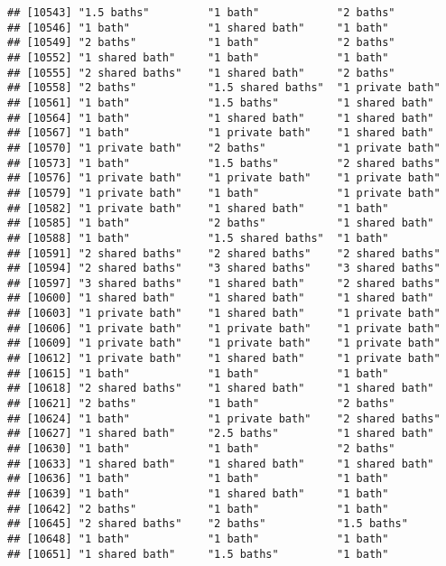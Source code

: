 \documentclass[
]{article}
\begin{document}
\begin{verbatim}
## [10543] "1.5 baths"         "1 bath"            "2 baths"          
## [10546] "1 bath"            "1 shared bath"     "1 bath"           
## [10549] "2 baths"           "1 bath"            "2 baths"          
## [10552] "1 shared bath"     "1 bath"            "1 bath"           
## [10555] "2 shared baths"    "1 shared bath"     "2 baths"          
## [10558] "2 baths"           "1.5 shared baths"  "1 private bath"   
## [10561] "1 bath"            "1.5 baths"         "1 shared bath"    
## [10564] "1 bath"            "1 shared bath"     "1 shared bath"    
## [10567] "1 bath"            "1 private bath"    "1 shared bath"    
## [10570] "1 private bath"    "2 baths"           "1 private bath"   
## [10573] "1 bath"            "1.5 baths"         "2 shared baths"   
## [10576] "1 private bath"    "1 private bath"    "1 private bath"   
## [10579] "1 private bath"    "1 bath"            "1 private bath"   
## [10582] "1 private bath"    "1 shared bath"     "1 bath"           
## [10585] "1 bath"            "2 baths"           "1 shared bath"    
## [10588] "1 bath"            "1.5 shared baths"  "1 bath"           
## [10591] "2 shared baths"    "2 shared baths"    "2 shared baths"   
## [10594] "2 shared baths"    "3 shared baths"    "3 shared baths"   
## [10597] "3 shared baths"    "1 shared bath"     "2 shared baths"   
## [10600] "1 shared bath"     "1 shared bath"     "1 shared bath"    
## [10603] "1 private bath"    "1 shared bath"     "1 private bath"   
## [10606] "1 private bath"    "1 private bath"    "1 private bath"   
## [10609] "1 private bath"    "1 private bath"    "1 private bath"   
## [10612] "1 private bath"    "1 shared bath"     "1 private bath"   
## [10615] "1 bath"            "1 bath"            "1 bath"           
## [10618] "2 shared baths"    "1 shared bath"     "1 shared bath"    
## [10621] "2 baths"           "1 bath"            "2 baths"          
## [10624] "1 bath"            "1 private bath"    "2 shared baths"   
## [10627] "1 shared bath"     "2.5 baths"         "1 shared bath"    
## [10630] "1 bath"            "1 bath"            "2 baths"          
## [10633] "1 shared bath"     "1 shared bath"     "1 shared bath"    
## [10636] "1 bath"            "1 bath"            "1 bath"           
## [10639] "1 bath"            "1 shared bath"     "1 bath"           
## [10642] "2 baths"           "1 bath"            "1 bath"           
## [10645] "2 shared baths"    "2 baths"           "1.5 baths"        
## [10648] "1 bath"            "1 bath"            "1 bath"           
## [10651] "1 shared bath"     "1.5 baths"         "1 bath"           

\end{verbatim}
\end{document}
